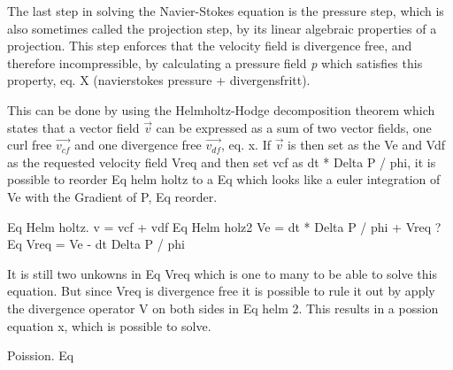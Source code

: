 The last step in solving the Navier-Stokes equation is the pressure step, which is also sometimes called the projection step, by its linear algebraic properties of a projection. This step enforces that the velocity field is divergence free, and therefore incompressible, by calculating a pressure field \emph{p} which satisfies this property, eq. X (navierstokes pressure + divergensfritt). 

This can be done by using the Helmholtz-Hodge decomposition theorem which states that a vector field $\vec{v}$ can be expressed as a sum of two vector fields, one curl free $\vec{v_{cf}}$ and one divergence free $\vec{v_{df}}$, eq. x. If $\vec{v}$ is then set as the Ve and Vdf as the requested velocity field Vreq and then set vcf as dt * Delta P / phi, it is possible to reorder Eq helm holtz to a Eq which looks like a euler integration of Ve with the Gradient of P, Eq reorder. 

Eq Helm holtz. v = vcf  + vdf
Eq Helm holz2 Ve = dt * Delta P / phi + Vreq ? 
Eq Vreq = Ve - dt Delta P / phi

It is still two unkowns in Eq Vreq which is one to many to be able to solve this equation. But since Vreq is divergence free it is possible to rule it out by apply the divergence operator V on both sides in Eq helm 2. This results in a possion equation x, which is possible to solve. 

Poission. Eq

